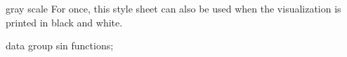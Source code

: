\begin{stylesheet}{gray scale}
  For once, this style sheet can also be used when the visualization
  is printed in black and white.
\begin{codeexample}[width=10cm]
\tikz \datavisualization [
  visualize as smooth line/.list=
    {1,2,3,4,5,6,7,8},
  example visualization,
  style sheet=gray scale]
data group {sin functions};
\end{codeexample}
\end{stylesheet}

